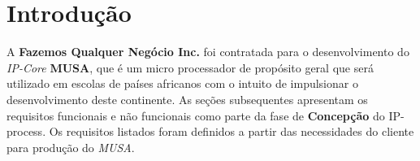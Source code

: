 \section{Introdução}

 A \textbf{Fazemos Qualquer Negócio Inc.} foi contratada para o desenvolvimento do \textit{IP-Core} \textbf{MUSA}, que é um micro processador de
 propósito geral que será utilizado em escolas de países africanos com o intuito de impulsionar o desenvolvimento deste continente. As seções
 subsequentes apresentam os requisitos funcionais e não funcionais como parte da fase de \textbf{Concepção} do IP-process.
 Os requisitos listados foram definidos a partir das necessidades do cliente para produção do \textit{MUSA}.